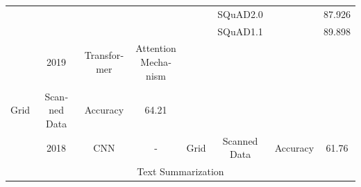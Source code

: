 \documentclass[12pt, a4paper, oneside]{report}
\begin{document}
\begin{tiny}
\begin{latin}
\begin{longtable}{|c|c|c|c|c|c|cc|}
                                                                              &                       &                                   &                                         &                                                                                                        & SQuAD2.0                              & \multicolumn{1}{c|}{}                                                                                                              & 87.926 \\ \cline{6-6} \cline{8-8} 
                                                                              &                       &                                   &                                         &                                                                                                        & SQuAD1.1                              & \multicolumn{1}{c|}{}                                                                                                              & 89.898 \\ \hline
        \cite{denk2019bertgrid}                              & 2019                  & Transformer                       & Attention Mechanism                     & \begin{tabular}[c]{@{}c@{}}BERT\\ \\ Grid\end{tabular}                                                 & Scanned Data                          & \multicolumn{1}{c|}{Accuracy}                                                                                                      & 64.21  \\ \hline
        \cite{katti2018chargrid}                             & 2018                  & CNN                               & -                                       & Grid                                                                                                   & Scanned Data                          & \multicolumn{1}{c|}{Accuracy}                                                                                                      & 61.76  \\ \hline
        \multicolumn{8}{|c|}{Text Summarization}                                                                                                                                                                                                                                                                                                                                                                                                                                       \\ \hline

\end{longtable}
\end{latin}
\end{tiny}
\end{document}
